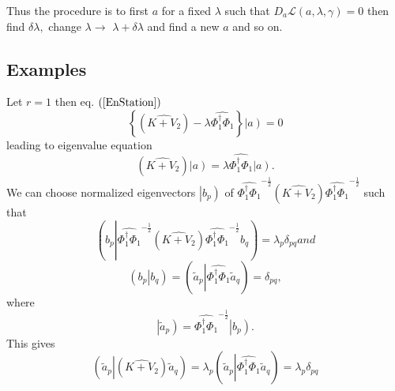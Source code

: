 \documentclass[aps,preprint]{revtex4}%
\begin{document}
Thus the procedure is to first $a$ for a fixed $\lambda$ such that
$D_{a}\mathcal{L}\left(  a,\lambda,\gamma\right)  =0$ then find $\delta
\lambda,$ change $\lambda\rightarrow$ $\lambda+\delta\lambda$ and find a new
$a$ and so on.

\subsection{Examples}

Let $r=1$ then eq. $\left(  \ref{EnStation}\right)  $
\begin{equation}
\left\{  \left(  \widehat{K+V_{2}}\right)  -\lambda\widehat{\Phi_{1}^{\dagger
}\Phi_{1}}\right\}  \left\vert \overset{}{a}\right)  =0
\end{equation}
leading to eigenvalue equation
\begin{equation}
\left(  \widehat{K+V_{2}}\right)  \left\vert \overset{}{a}\right)
=\lambda\widehat{\Phi_{1}^{\dagger}\Phi_{1}}\left\vert \overset{}{a}\right)  .
\label{e1}%
\end{equation}
We can choose normalized eigenvectors $\left\vert b_{p}\right)  $ of
$\widehat{\Phi_{1}^{\dagger}\Phi_{1}}^{-\frac{1}{2}}\left(  \widehat{K+V_{2}%
}\right)  \widehat{\Phi_{1}^{\dagger}\Phi_{1}}^{-\frac{1}{2}}$ such that
\begin{subequations}
\begin{equation}
\left(  b_{p}\left\vert \widehat{\Phi_{1}^{\dagger}\Phi_{1}}^{-\frac{1}{2}%
}\left(  \widehat{K+V_{2}}\right)  \widehat{\Phi_{1}^{\dagger}\Phi_{1}%
}^{-\frac{1}{2}}b_{q}\right.  \right)  =\lambda_{p}\delta_{pq}%
\end{equation}
and
\end{subequations}
\begin{equation}
\left(  b_{p}\left\vert b_{q}\right.  \right)  =\left(  \tilde{a}%
_{p}\left\vert \widehat{\Phi_{1}^{\dagger}\Phi_{1}}\tilde{a}_{q}\right.
\right)  =\delta_{pq},
\end{equation}
where
\begin{equation}
\left\vert \overset{}{\tilde{a}_{p}}\right)  =\widehat{\Phi_{1}^{\dagger}%
\Phi_{1}}^{-\frac{1}{2}}\left\vert \overset{}{b_{p}}\right)  .
\end{equation}
This gives
\begin{equation}
\left(  \tilde{a}_{p}\left\vert \left(  \widehat{K+V_{2}}\right)  \tilde
{a}_{q}\right.  \right)  =\lambda_{p}\left(  \tilde{a}_{p}\left\vert
\widehat{\Phi_{1}^{\dagger}\Phi_{1}}\tilde{a}_{q}\right.  \right)
=\lambda_{p}\delta_{pq}%
\end{equation}
\end{document}
